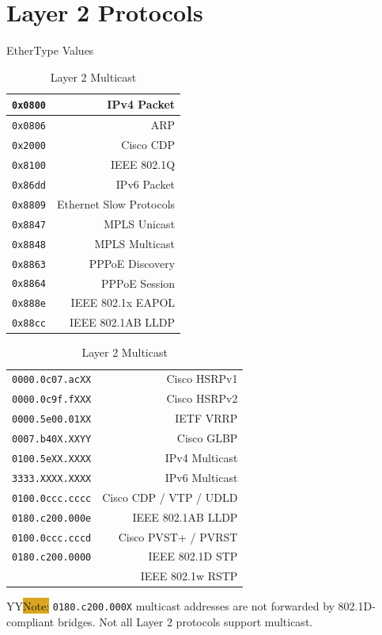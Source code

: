 \documentclass[12pt]{article}
\newcommand{\printColor}{Y}								%
\newcommand{\note}[1]{\if\printColor Y{\colorbox{#1}{Note:}}\else{\underline{Note:}}\fi}
\begin{document}
\section{Layer 2 Protocols \label{sec:L2}}
	\begin{table}[H]
	\begin{minipage}[t]{.4\linewidth}
	\centering
	\caption{EtherType Values \label{tab:ETHERTYPE}}
	\begin{tabular}{| c | r |}\hline
	\texttt{0x0800}	& IPv4 Packet\\\hline
	\texttt{0x0806}	& ARP\\\hline
	\texttt{0x2000}	& Cisco CDP\\\hline
	\texttt{0x8100}	& IEEE 802.1Q\\\hline
	\texttt{0x86dd}	& IPv6 Packet\\\hline
	\texttt{0x8809}	& Ethernet Slow Protocols\\\hline
	\texttt{0x8847}	& MPLS Unicast\\
	\texttt{0x8848}	& MPLS Multicast\\\hline
	\texttt{0x8863}	& PPPoE Discovery\\
	\texttt{0x8864}	& PPPoE Session\\\hline
	\texttt{0x888e}	& IEEE 802.1x EAPOL\\\hline
	\texttt{0x88cc}	& IEEE 802.1AB LLDP\\\hline
	\end{tabular}\end{minipage}\hfill
	\begin{minipage}[t]{.6\linewidth}
	\centering
	\caption{Layer 2 Multicast \label{tab:MULTICAST L2}}
	\begin{tabular}{| l | r |}\hline
	\texttt{0000.0c07.acXX}		& Cisco HSRPv1\\
	\texttt{0000.0c9f.fXXX}		& Cisco HSRPv2\\\hline
	\texttt{0000.5e00.01XX} 		& IETF VRRP\\\hline
	\texttt{0007.b40X.XXYY}		& Cisco GLBP\\\hline
	\texttt{0100.5eXX.XXXX}		& IPv4 Multicast\\
	\texttt{3333.XXXX.XXXX}		& IPv6 Multicast\\\hline
	\texttt{0100.0ccc.cccc}	 	& Cisco CDP / VTP / UDLD\\\hline
	\texttt{0180.c200.000e}	 	& IEEE 802.1AB LLDP\\\hline
	\texttt{0100.0ccc.cccd}		& Cisco PVST+ / PVRST\\\hline
	\texttt{0180.c200.0000}	 	& IEEE 802.1D STP\\
						& IEEE 802.1w RSTP\\\hline
	\end{tabular}\end{minipage}\end{table}
	\note{Goldenrod} \texttt{0180.c200.000X} multicast addresses are not forwarded by 802.1D-compliant bridges. Not all Layer 2 protocols support multicast.
\end{document}
